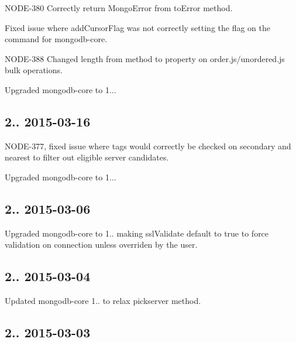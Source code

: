 \begin{DoxyItemize}
\item N\+O\+D\+E-\/380 Correctly return Mongo\+Error from to\+Error method.
\item Fixed issue where add\+Cursor\+Flag was not correctly setting the flag on the command for mongodb-\/core.
\item N\+O\+D\+E-\/388 Changed length from method to property on order.\+js/unordered.js bulk operations.
\item Upgraded mongodb-\/core to 1...
\end{DoxyItemize}

\subsection*{2.. 2015-\/03-\/16 }


\begin{DoxyItemize}
\item N\+O\+D\+E-\/377, fixed issue where tags would correctly be checked on secondary and nearest to filter out eligible server candidates.
\item Upgraded mongodb-\/core to 1...
\end{DoxyItemize}

\subsection*{2.. 2015-\/03-\/06 }


\begin{DoxyItemize}
\item Upgraded mongodb-\/core to 1.. making ssl\+Validate default to true to force validation on connection unless overriden by the user.
\end{DoxyItemize}

\subsection*{2.. 2015-\/03-\/04 }


\begin{DoxyItemize}
\item Updated mongodb-\/core 1.. to relax pickserver method.
\end{DoxyItemize}

\subsection*{2.. 2015-\/03-\/03 }


